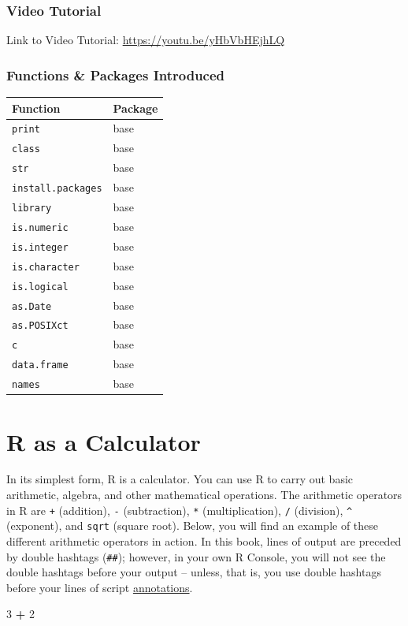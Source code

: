 \documentclass[]{book}
\newenvironment{Shaded}{\begin{snugshade}}{\end{snugshade}}
\newcommand{\DecValTok}[1]{\textcolor[rgb]{0.00,0.00,0.81}{#1}}
\newcommand{\StringTok}[1]{\textcolor[rgb]{0.31,0.60,0.02}{#1}}
\newcommand{\OperatorTok}[1]{\textcolor[rgb]{0.81,0.36,0.00}{\textbf{#1}}}
\begin{document}
\subsubsection{Video Tutorial}\label{video-tutorial}

Link to Video Tutorial: \url{https://youtu.be/yHbVbHEjhLQ}

\subsubsection{Functions \& Packages
Introduced}\label{functions-packages-introduced}

\begin{longtable}[]{@{}ll@{}}
\toprule
Function & Package\tabularnewline
\midrule
\endhead
\texttt{print} & base\tabularnewline
\texttt{class} & base\tabularnewline
\texttt{str} & base\tabularnewline
\texttt{install.packages} & base\tabularnewline
\texttt{library} & base\tabularnewline
\texttt{is.numeric} & base\tabularnewline
\texttt{is.integer} & base\tabularnewline
\texttt{is.character} & base\tabularnewline
\texttt{is.logical} & base\tabularnewline
\texttt{as.Date} & base\tabularnewline
\texttt{as.POSIXct} & base\tabularnewline
\texttt{c} & base\tabularnewline
\texttt{data.frame} & base\tabularnewline
\texttt{names} & base\tabularnewline
\bottomrule
\end{longtable}

\section{R as a Calculator}\label{r-as-a-calculator}

In its simplest form, R is a calculator. You can use R to carry out
basic arithmetic, algebra, and other mathematical operations. The
arithmetic operators in R are \texttt{+} (addition), \texttt{-}
(subtraction), \texttt{*} (multiplication), \texttt{/} (division),
\texttt{\^{}} (exponent), and \texttt{sqrt} (square root). Below, you
will find an example of these different arithmetic operators in action.
In this book, lines of output are preceded by double hashtags
(\texttt{\#\#}); however, in your own R Console, you will not see the
double hashtags before your output -- unless, that is, you use double
hashtags before your lines of script
\protect\hyperlink{annotate}{annotations}.

\begin{Shaded}
\begin{Highlighting}[]
\DecValTok{3} \OperatorTok{+}\StringTok{ }\DecValTok{2}
\end{Highlighting}
\end{Shaded}
\end{document}
